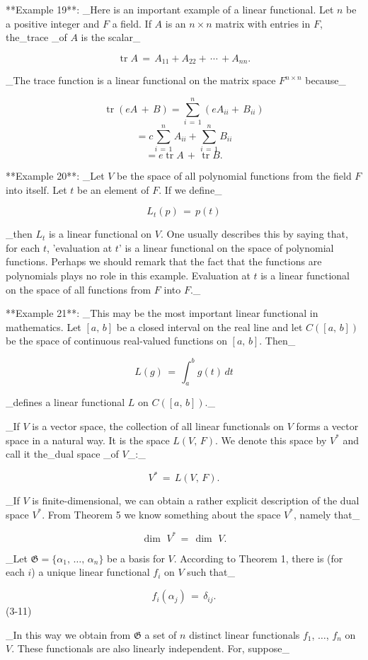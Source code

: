 

**Example 19**: _Here is an important example of a linear functional. Let \(n\) be a positive integer and \(F\) a field. If \(A\) is an \(n\times n\) matrix with entries in \(F\), the_trace _of \(A\) is the scalar_

\[\operatorname{tr}A\,=\,A_{11}+A_{22}+\,\cdots\,+A_{nn}.\]

_The trace function is a linear functional on the matrix space \(F^{n\times n}\) because_

\[\operatorname{tr}\left(eA\,+\,B\right) = \mathop{\sum}\limits_{i\,=\,1}^{n}\left(eA_{ii}+\,B_{ii}\right)\] \[= c\mathop{\sum}\limits_{i\,=\,1}^{n}A_{ii}+\mathop{\sum} \limits_{i\,=\,1}^{n}B_{ii}\] \[= e\operatorname{tr}A\,+\,\operatorname{tr}B.\]

**Example 20**: _Let \(V\) be the space of all polynomial functions from the field \(F\) into itself. Let \(t\) be an element of \(F\). If we define_

\[L_{t}(p)\,=\,p(t)\]

_then \(L_{t}\) is a linear functional on \(V\). One usually describes this by saying that, for each \(t\), 'evaluation at \(t\)' is a linear functional on the space of polynomial functions. Perhaps we should remark that the fact that the functions are polynomials plays no role in this example. Evaluation at \(t\) is a linear functional on the space of all functions from \(F\) into \(F\)._

**Example 21**: _This may be the most important linear functional in mathematics. Let \([a,\,b]\) be a closed interval on the real line and let \(C([a,\,b])\) be the space of continuous real-valued functions on \([a,\,b]\). Then_

\[L(g)\,=\,\int_{a}^{b}g(t)\,dt\]

_defines a linear functional \(L\) on \(C([a,\,b])\)._

_If \(V\) is a vector space, the collection of all linear functionals on \(V\) forms a vector space in a natural way. It is the space \(L(V,\,F)\). We denote this space by \(V^{*}\) and call it the_dual space _of \(V\)_:_

\[V^{*}\,=\,L(V,\,F).\]

_If \(V\) is finite-dimensional, we can obtain a rather explicit description of the dual space \(V^{*}\). From Theorem 5 we know something about the space \(V^{*}\), namely that_

\[\dim\,\,V^{*}\,=\,\dim\,\,V.\]

_Let \(\mathfrak{G}=\{\alpha_{1},\,\ldots,\,\alpha_{n}\}\) be a basis for \(V\). According to Theorem 1, there is (for each \(i\)) a unique linear functional \(f_{i}\) on \(V\) such that_

\[f_{i}(\alpha_{j})\,=\,\delta_{ij}.\] (3-11)

_In this way we obtain from \(\mathfrak{G}\) a set of \(n\) distinct linear functionals \(f_{1}\), \(\ldots\), \(f_{n}\) on \(V\). These functionals are also linearly independent. For, suppose_